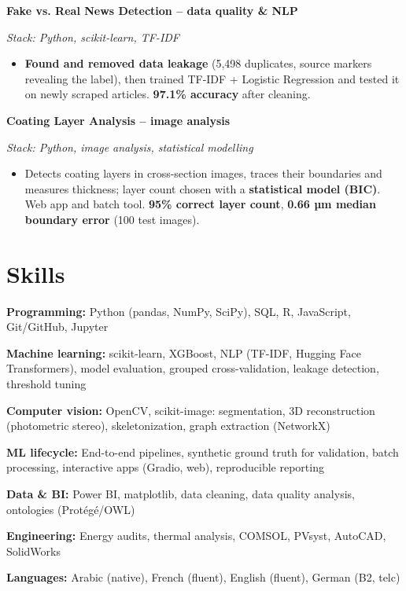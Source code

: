 \documentclass[10pt,a4paper]{article}
\newcommand{\project}[2]{\par\needspace{4\baselineskip}\vspace{4pt}\noindent\textbf{#1}\hfill\textit{#2}\par}
\newcommand{\projectx}[3]{\project{#1}{#2}\noindent\textit{Stack: #3}\par}
\begin{document}
\projectx{Fake vs. Real News Detection -- data quality \& NLP}{}{Python, scikit-learn, TF-IDF}
\begin{itemize}
  \item \textbf{Found and removed data leakage} (5,498 duplicates, source markers revealing the label), then trained TF-IDF + Logistic Regression and tested it on newly scraped articles. \textbf{97.1\% accuracy} after cleaning.
\end{itemize}

\projectx{Coating Layer Analysis -- image analysis}{}{Python, image analysis, statistical modelling}
\begin{itemize}
  \item Detects coating layers in cross-section images, traces their boundaries and measures thickness; layer count chosen with a \textbf{statistical model (BIC)}. Web app and batch tool. \textbf{95\% correct layer count}, \textbf{0.66 µm median boundary error} (100 test images).
\end{itemize}

\section{Skills}
\textbf{Programming:} Python (pandas, NumPy, SciPy), SQL, R, JavaScript, Git/GitHub, Jupyter\par
\textbf{Machine learning:} scikit-learn, XGBoost, NLP (TF-IDF, Hugging Face Transformers), model evaluation, grouped cross-validation, leakage detection, threshold tuning\par
\textbf{Computer vision:} OpenCV, scikit-image: segmentation, 3D reconstruction (photometric stereo), skeletonization, graph extraction (NetworkX)\par
\textbf{ML lifecycle:} End-to-end pipelines, synthetic ground truth for validation, batch processing, interactive apps (Gradio, web), reproducible reporting\par
\textbf{Data \& BI:} Power BI, matplotlib, data cleaning, data quality analysis, ontologies (Protégé/OWL)\par
\textbf{Engineering:} Energy audits, thermal analysis, COMSOL, PVsyst, AutoCAD, SolidWorks\par
\textbf{Languages:} Arabic (native), French (fluent), English (fluent), German (B2, telc)\par

\end{document}

